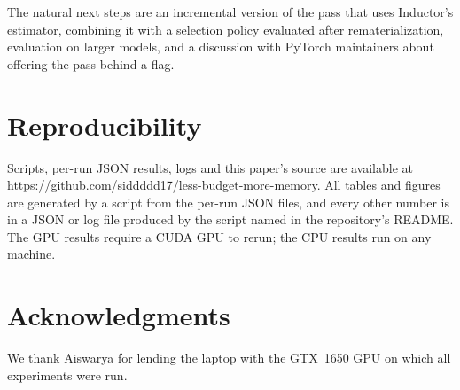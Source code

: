 \documentclass[10pt]{article}
\begin{document}
The natural next steps are an incremental version of the pass that uses Inductor's estimator, combining it with a
selection policy evaluated after rematerialization, evaluation on larger models, and a discussion with PyTorch
maintainers about offering the pass behind a flag.

\section*{Reproducibility}
Scripts, per-run JSON results, logs and this paper's source are available at\\
\url{https://github.com/siddddd17/less-budget-more-memory}.
All tables and figures are generated by a script from the per-run JSON files, and every other number is in a JSON or log
file produced by the script named in the repository's README. The GPU results require a CUDA GPU to rerun; the CPU
results run on any machine.

\section*{Acknowledgments}
We thank Aiswarya for lending the laptop with the GTX~1650 GPU on which all experiments were run.



\end{document}
